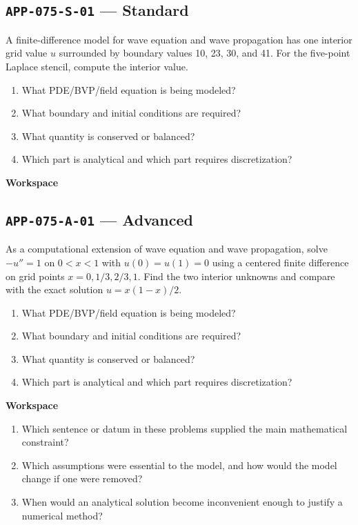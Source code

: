 \documentclass[11pt]{book}
\newcommand{\pid}[1]{\texttt{#1}}
\newcommand{\workspace}{\par\vspace{0.7in}\hrulefill\par\vspace{0.55in}\hrulefill\par}
\begin{document}
\subsection*{\pid{APP-075-S-01} — Standard}
\begin{problembox}
A finite-difference model for wave equation and wave propagation has one interior grid value $u$ surrounded by boundary values 10, 23, 30, and 41. For the five-point Laplace stencil, compute the interior value.
\end{problembox}
\begin{promptbox}\begin{enumerate}
\item What PDE/BVP/field equation is being modeled?
\item What boundary and initial conditions are required?
\item What quantity is conserved or balanced?
\item Which part is analytical and which part requires discretization?
\end{enumerate}\end{promptbox}
\textbf{Workspace}\workspace
{}
\subsection*{\pid{APP-075-A-01} — Advanced}
\begin{problembox}
As a computational extension of wave equation and wave propagation, solve $-u''=1$ on $0<x<1$ with $u(0)=u(1)=0$ using a centered finite difference on grid points $x=0,1/3,2/3,1$. Find the two interior unknowns and compare with the exact solution $u=x(1-x)/2$.
\end{problembox}
\begin{promptbox}\begin{enumerate}
\item What PDE/BVP/field equation is being modeled?
\item What boundary and initial conditions are required?
\item What quantity is conserved or balanced?
\item Which part is analytical and which part requires discretization?
\end{enumerate}\end{promptbox}
\textbf{Workspace}\workspace
\begin{reflectionbox}\begin{enumerate}
\item Which sentence or datum in these problems supplied the main mathematical constraint?
\item Which assumptions were essential to the model, and how would the model change if one were removed?
\item When would an analytical solution become inconvenient enough to justify a numerical method?
\end{enumerate}\end{reflectionbox}
\end{document}
